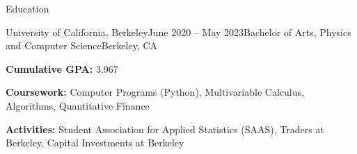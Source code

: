\documentclass{resume} %
\begin{document}

\begin{rSection}{Education}
    \begin{rSubsection}{University of California, Berkeley}{June 2020 – May 2023}{Bachelor of Arts, Physics and Computer Science}{Berkeley, CA}
        \item {\bf Cumulative GPA:} 3.967
        \item {\bf Coursework:} Computer Programs (Python), Multivariable Calculus, Algorithms, Quantitative Finance
        \item {\bf Activities:} Student Association for Applied Statistics (SAAS), Traders at Berkeley, Capital Investments at Berkeley
        \end{rSubsection}
    \end{rSection}

\end{document}
